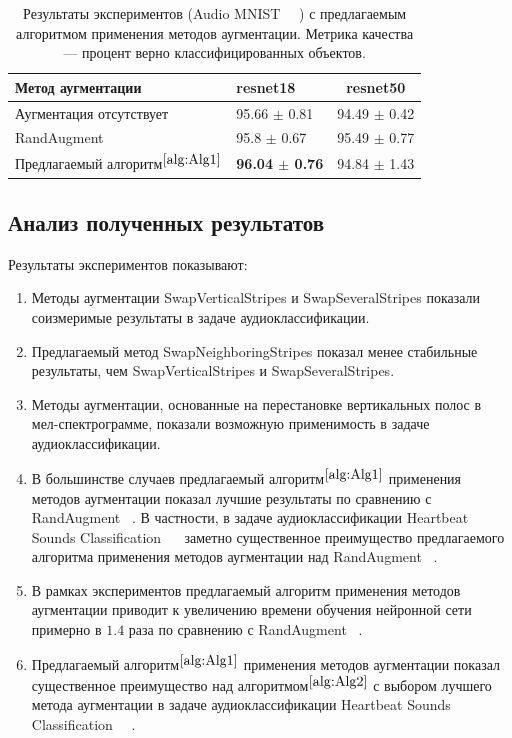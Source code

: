 \documentclass[12pt, fleqn]{article}
\begin{document}
\begin{table}[ht!]
    \centering
	\begin{tabular}{| l | l | c |}
    	\hline
	    Метод аугментации & resnet18 & resnet50 \\ \hline
	    Аугментация отсутствует  & 95.66 $\pm$ 0.81 & 94.49 $\pm$ 0.42 \\ \hline
	    RandAugment ~\cite{RandAugment} & 95.8 $\pm$ 0.67 & 95.49 $\pm$ 0.77 \\ \hline
	    Предлагаемый алгоритм$^{\ref{alg:Alg1}}$ & \textbf{96.04 $\pm$ 0.76} & 94.84 $\pm$ 1.43 \\ \hline
	\end{tabular}
	\caption{Результаты экспериментов (Audio MNIST ~\cite{AudioMnistArticle}~\cite{AudioMnistKaggle}) с предлагаемым алгоритмом применения методов аугментации. Метрика качества --- процент верно классифицированных объектов.}
	\label{table:lukianov_pavel_t8}
\end{table}


\newpage
\subsection{Анализ полученных результатов}

Результаты экспериментов показывают:

\begin{enumerate}
    \item Методы аугментации SwapVerticalStripes и SwapSeveralStripes показали соизмеримые результаты в задаче аудиоклассификации.
    \item Предлагаемый метод SwapNeighboringStripes показал менее стабильные результаты, чем SwapVerticalStripes и SwapSeveralStripes.
    \item Методы аугментации, основанные на перестановке вертикальных полос в мел-спектрограмме, показали возможную применимость в задаче аудиоклассификации.
    \item В большинстве случаев предлагаемый алгоритм$^{\ref{alg:Alg1}}$ применения методов аугментации показал лучшие результаты по сравнению с RandAugment ~\cite{RandAugment}. В частности, в задаче аудиоклассификации Heartbeat Sounds Classification ~\cite{HeartbeatSoundsArticle}~\cite{HeartbeatSoundsKaggle} заметно существенное преимущество предлагаемого алгоритма применения методов аугментации над RandAugment ~\cite{RandAugment}.
    \item В рамках экспериментов предлагаемый алгоритм применения методов аугментации приводит к увеличению времени обучения нейронной сети примерно в $1.4$ раза по сравнению с RandAugment ~\cite{RandAugment}.
    \item Предлагаемый алгоритм$^{\ref{alg:Alg1}}$ применения методов аугментации показал существенное преимущество над алгоритмом$^{\ref{alg:Alg2}}$ с выбором лучшего метода аугментации в задаче аудиоклассификации Heartbeat Sounds Classification ~\cite{HeartbeatSoundsArticle}~\cite{HeartbeatSoundsKaggle}.
\end{enumerate}
\newpage
\end{document}
